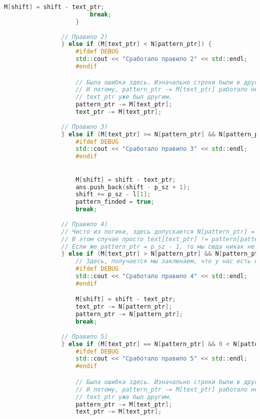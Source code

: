 \begin{lstlisting}[language=C++]
                        M[shift] = shift - text_ptr;
                        break;
                    }
                
                // Правило 2)
                } else if (M[text_ptr] < N[pattern_ptr]) {
                    #ifdef DEBUG
                    std::cout << "Сработало правило 2" << std::endl;
                    #endif

                    // Была ошибка здесь. Изначально строки были в другом порядке
                    // И потому, pattern_ptr -= M[text_ptr] работало неверно, т.к.
                    // text_ptr уже был другим.
                    pattern_ptr -= M[text_ptr];
                    text_ptr -= M[text_ptr];
                
                // Правило 3)
                } else if (M[text_ptr] >= N[pattern_ptr] && N[pattern_ptr] == pattern_ptr + 1) {
                    #ifdef DEBUG
                    std::cout << "Сработало правило 3" << std::endl;
                    #endif

                    
                    M[shift] = shift - text_ptr;
                    ans.push_back(shift - p_sz + 1);
                    shift += p_sz - l[1];
                    pattern_finded = true;
                    break;
                
                // Правило 4)
                // Чисто из логики, здесь допускается N[pattern_ptr] = 0
                // В этом случае просто text[text_ptr] != pattern[pattern_ptr] а всё правее (если оно есть) равно
                // Если же pattern_ptr = p_sz - 1, то мы сюда никак не попадём, т.к. N[p_sz - 1] = p_sz
                } else if (M[text_ptr] > N[pattern_ptr] && N[pattern_ptr] < pattern_ptr + 1) {
                    // Здесь, получается мы заключаем, что у нас есть несовпадение.
                    #ifdef DEBUG
                    std::cout << "Сработало правило 4" << std::endl;
                    #endif

                    M[shift] = shift - text_ptr;
                    text_ptr -= N[pattern_ptr];
                    pattern_ptr -= N[pattern_ptr];
                    break;
                
                // Правило 5) 
                } else if (M[text_ptr] == N[pattern_ptr] && 0 < N[pattern_ptr] && N[pattern_ptr] < pattern_ptr + 1) {
                    #ifdef DEBUG
                    std::cout << "Сработало правило 5" << std::endl;
                    #endif

                    // Была ошибка здесь. Изначально строки были в другом порядке
                    // И потому, pattern_ptr -= M[text_ptr] работало неверно, т.к.
                    // text_ptr уже был другим.
                    pattern_ptr -= M[text_ptr];
                    text_ptr -= M[text_ptr];
                

\end{lstlisting}
